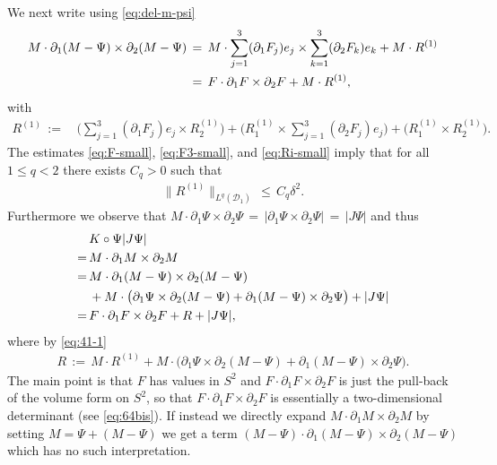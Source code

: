 \documentclass[reqno,makeidx,12pt]{amsart}
\theoremstyle{note}
\theoremstyle{definition}
\begin{document}
We next write using \eqref{eq:del-m-psi}
\begin{align}
	M\cdot \partial_1 (M-\Psi) \times \partial_2 (M-\Psi) \,&=\, M\cdot \sum_{j=1}^3 (\partial_1 F_j)e_j \times \sum_{k=1}^3 (\partial_2 F_k)e_k + M\cdot R^{(1)} \notag\\
	\,&=\, F\cdot\partial_1 F \times \partial_2 F + M\cdot R^{(1)},\label{eq:41-1}
\end{align}
with
\begin{align*}
	R^{(1)}\,:=\, &\Big(\sum_{j=1}^3 (\partial_1 F_j) e_j \times R_2^{(1)}\Big) + \Big(R_1^{(1)}\times \sum_{j=1}^3 (\partial_2 F_j) e_j \Big)+ \Big(R_1^{(1)}\times R_2^{(1)}\Big).
\end{align*}
The estimates \eqref{eq:F-small}, \eqref{eq:F3-small}, and \eqref{eq:Ri-small} imply that for all $1\leq q<2$ there exists $C_q>0$ such that
\begin{gather}
	\|R^{(1)}\|_{L^q({\mathcal{D}}_1)}\,\leq\, C_q \delta^2. \label{eq:R1-small}
\end{gather}
Furthermore we observe that $M\cdot \partial_1\Psi\times\partial_2\Psi \,=\, |\partial_1\Psi\times\partial_2\Psi|\,=\, |J\Psi|$ and thus
\begin{align}
	&K\circ\Psi |J\Psi| \notag\\
	=\, &M\cdot \partial_1 M \times\partial_2 M \notag\\
	=\, &M\cdot \partial_1(M-\Psi)\times \partial_2 (M-\Psi) \notag\\
	&+ M\cdot \big(\partial_1\Psi\times \partial_2 (M -\Psi) +\partial_1(M-\Psi)\times\partial_2\Psi\big) + |J\Psi| \notag\\
	=\, &F\cdot\partial_1 F \times \partial_2 F +R + |J\Psi|, \label{eq:KdetF}
\end{align}
where by \eqref{eq:41-1}
\begin{gather}
	R\,:=\,  M\cdot R^{(1)}+ M\cdot \big(\partial_1\Psi\times \partial_2 (M -\Psi) +\partial_1(M-\Psi)\times\partial_2\Psi\big). \label{eq:def-R}
\end{gather}
The main point is that $F$ has values in $S^2$ and $F\cdot \partial_1F\times\partial_2 F$ is just the pull-back of the volume form on $S^2$, so that $F\cdot \partial_1F\times\partial_2 F$ is essentially a two-dimensional determinant (see \eqref{eq:64bis}). If instead we directly expand $M\cdot\partial_1 M\times\partial_2 M$ by setting $M=\Psi+(M-\Psi)$ we get a term $(M-\Psi)\cdot\partial_1 (M-\Psi)\times\partial_2 (M-\Psi)$ which has no such interpretation.
\end{document}
